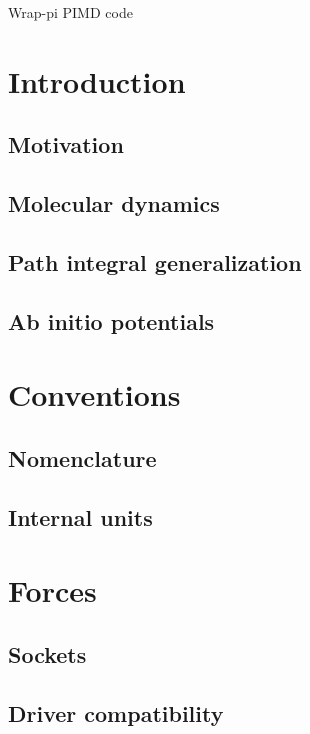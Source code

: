\documentclass[12pt,fleqn]{report}
\begin{document}
\begin{titlepage}
\begin{center}

\vspace*{+5.5cm}

{\LARGE Wrap-pi PIMD code}
\end{center}
\end{titlepage}


\tableofcontents
\listoffigures

\newpage
{}

\chapter{Introduction}
\section{Motivation}
\section{Molecular dynamics}
\section{Path integral generalization}
\section{Ab initio potentials}

\chapter{Conventions}
\section{Nomenclature}
\section{Internal units}

\chapter{Forces}
\section{Sockets}
\section{Driver compatibility}
\end{document}
